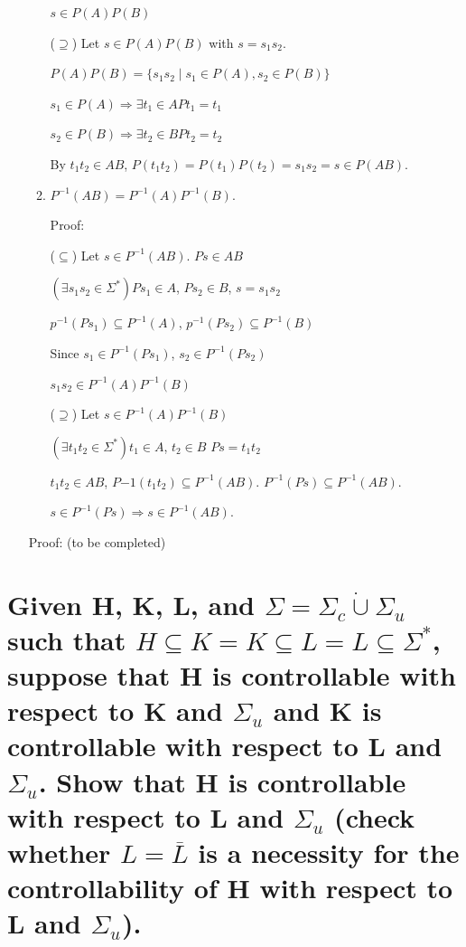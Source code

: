 \documentclass{article}
\begin{document}
\begin{enumerate}
\begin{enumerate}
    $s \in P(A)P(B)$

    ($\supseteq$) Let $s \in P(A)P(B)$ with $s = s_1s_2$.

    $P(A)P(B) = \{s_1s_2 \mid s_1 \in P(A), s_2 \in P(B)\}$

    $s_1 \in P(A) \Rightarrow \exists t_1 \in A Pt_1 = t_1$

    $s_2 \in P(B) \Rightarrow \exists t_2 \in B Pt_2 = t_2$

    By $t_1t_2 \in AB$, $P(t_1t_2) = P(t_1)P(t_2) = s_1s_2 = s \in P(AB)$.


    
    \item $P^{-1}(AB) = P^{-1}(A)P^{-1}(B)$.
    
    Proof:
    
    ($\subseteq$) Let $s \in P^{-1}(AB)$. $Ps \in AB$

    $(\exists s_1s_2 \in \Sigma^*) Ps_1 \in A$, $Ps_2 \in B$, $s = s_1s_2$

    $p^{-1}(Ps_1) \subseteq P^{-1}(A)$, $p^{-1}(Ps_2) \subseteq P^{-1}(B)$

    Since $s_1 \in P^{-1}(Ps_1)$, $s_2 \in P^{-1}(Ps_2)$

    $s_1s_2 \in P^{-1}(A)P^{-1}(B)$

    ($\supseteq$) Let $s \in P^{-1}(A)P^{-1}(B)$

    $(\exists t_1t_2 \in \Sigma^*) t_1 \in A$, $t_2 \in B$ $Ps=t_1t_2$

    $t_1t_2 \in AB$, $P{-1}(t_1t_2) \subseteq P^{-1}(AB)$. $P^{-1}(Ps) \subseteq P^{-1}(AB)$.

    $s \in P^{-1}(Ps) \Rightarrow s \in P^{-1}(AB)$.



    
  \end{enumerate}
  
  Proof: (to be completed)
\end{enumerate}

\section{Given H, K, L, and $\Sigma = \Sigma_c \dot{\cup} \Sigma_u$ such that $H \subseteq K = K \subseteq L = L \subseteq \Sigma^*$, suppose that H is controllable with respect to K and $\Sigma_u$ and K is controllable with respect to L and $\Sigma_u$. Show that H is controllable with respect to L and $\Sigma_u$ (check whether $L = \overline{L}$ is a necessity for the controllability of H with respect to L and $\Sigma_u$).}
\end{document}
